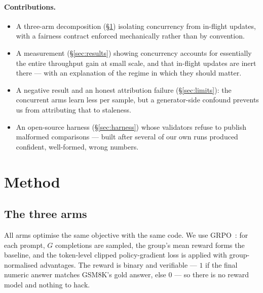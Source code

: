 \documentclass[11pt]{article}
\begin{document}
\paragraph{Contributions.}
\begin{itemize}
\item A three-arm decomposition (\S\ref{sec:method}) isolating concurrency from in-flight
updates, with a fairness contract enforced mechanically rather than by convention.
\item A measurement (\S\ref{sec:results}) showing concurrency accounts for essentially the
entire throughput gain at small scale, and that in-flight updates are inert there --- with an
explanation of the regime in which they should matter.
\item A negative result and an honest attribution failure (\S\ref{sec:limits}): the
concurrent arms learn less per sample, but a generator-side confound prevents us from
attributing that to staleness.
\item An open-source harness (\S\ref{sec:harness}) whose validators refuse to publish
malformed comparisons --- built after several of our own runs produced confident, well-formed,
wrong numbers.
\end{itemize}

\section{Method}\label{sec:method}

\subsection{The three arms}

All arms optimise the same objective with the same code. We use GRPO~\cite{grpo}: for each
prompt, $G$ completions are sampled, the group's mean reward forms the baseline, and the
token-level clipped policy-gradient loss is applied with group-normalised advantages. The
reward is binary and verifiable --- $1$ if the final numeric answer matches GSM8K's gold
answer, else $0$ --- so there is no reward model and nothing to hack.
\end{document}

